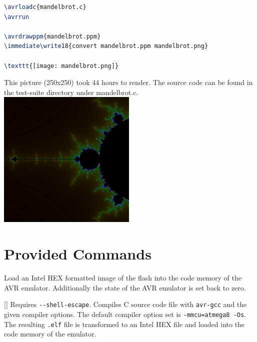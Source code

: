 \documentclass{article}
\begin{document}
\begin{tcolorbox}
\begin{lstlisting}[language=TeX]
\avrloadc{mandelbrot.c}
\avrrun

\avrdrawppm{mandelbrot.ppm}
\immediate\write18{convert mandelbrot.ppm mandelbrot.png}
  
\texttt{[image: mandelbrot.png]}
\end{lstlisting}
  \tcblower
  This picture (250x250) took 44 hours to render. The source code can be found in the test-suite
  directory under mandelbrot.c.\\

  \includegraphics[width=\linewidth]{imgs/mandelbrot-250x250}
\end{tcolorbox}

\section{Provided Commands}

Load an Intel HEX formatted image of the flash into the code memory of the AVR
emulator. Additionally the state of the AVR emulator is set back to zero.

\DescribeMacro{\avrloadc}[]{}
Requires \verb|--shell-escape|. Compiles C source code file with \verb|avr-gcc| and the given
compiler options. The default compiler option set is \verb|-mmcu=atmega8 -Os|. The resulting
\texttt{.elf} file is transformed to an Intel HEX file and loaded into the code memory of the
emulator.
\end{document}
